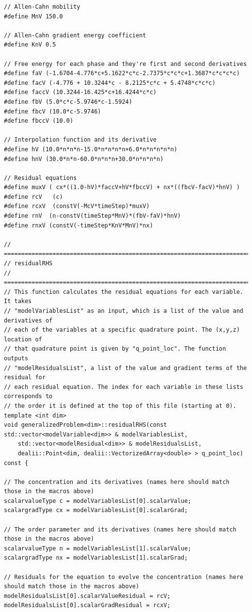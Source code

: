 \documentclass[10pt]{article} %
\begin{document}
\begin{lstlisting}
// Allen-Cahn mobility
#define MnV 150.0

// Allen-Cahn gradient energy coefficient
#define KnV 0.5

// Free energy for each phase and they're first and second derivatives
#define faV (-1.6704-4.776*c+5.1622*c*c-2.7375*c*c*c+1.3687*c*c*c*c)
#define facV (-4.776 + 10.3244*c - 8.2125*c*c + 5.4748*c*c*c)
#define faccV (10.3244-16.425*c+16.4244*c*c)
#define fbV (5.0*c*c-5.9746*c-1.5924)
#define fbcV (10.0*c-5.9746)
#define fbccV (10.0)

// Interpolation function and its derivative
#define hV (10.0*n*n*n-15.0*n*n*n*n+6.0*n*n*n*n*n)
#define hnV (30.0*n*n-60.0*n*n*n+30.0*n*n*n*n)

// Residual equations
#define muxV ( cx*((1.0-hV)*faccV+hV*fbccV) + nx*((fbcV-facV)*hnV) )
#define rcV   (c)
#define rcxV  (constV(-McV*timeStep)*muxV)
#define rnV  (n-constV(timeStep*MnV)*(fbV-faV)*hnV)
#define rnxV (constV(-timeStep*KnV*MnV)*nx)

// =================================================================================
// residualRHS
// =================================================================================
// This function calculates the residual equations for each variable. It takes
// "modelVariablesList" as an input, which is a list of the value and derivatives of
// each of the variables at a specific quadrature point. The (x,y,z) location of
// that quadrature point is given by "q_point_loc". The function outputs
// "modelResidualsList", a list of the value and gradient terms of the residual for
// each residual equation. The index for each variable in these lists corresponds to
// the order it is defined at the top of this file (starting at 0).
template <int dim>
void generalizedProblem<dim>::residualRHS(const std::vector<modelVariable<dim>> & modelVariablesList,
	std::vector<modelResidual<dim>> & modelResidualsList,
	dealii::Point<dim, dealii::VectorizedArray<double> > q_point_loc) const {

// The concentration and its derivatives (names here should match those in the macros above)
scalarvalueType c = modelVariablesList[0].scalarValue;
scalargradType cx = modelVariablesList[0].scalarGrad;

// The order parameter and its derivatives (names here should match those in the macros above)
scalarvalueType n = modelVariablesList[1].scalarValue;
scalargradType nx = modelVariablesList[1].scalarGrad;

// Residuals for the equation to evolve the concentration (names here should match those in the macros above)
modelResidualsList[0].scalarValueResidual = rcV;
modelResidualsList[0].scalarGradResidual = rcxV;


\end{lstlisting}
\end{document}
